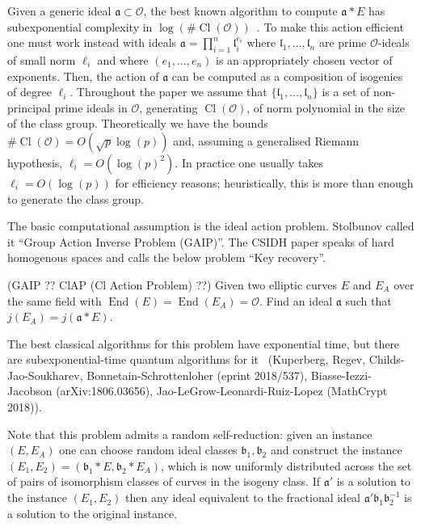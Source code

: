 \documentclass{llncs}
\newcommand{\OO}{\mathcal{O}}
\DeclareMathOperator{\End}{End}
\DeclareMathOperator{\Cl}{Cl}
\renewcommand{\a}{\mathfrak{a}}
\renewcommand{\b}{\mathfrak{b}}
\renewcommand{\l}{\mathfrak{l}}
\begin{document}
Given a generic ideal $\a\subset\OO$, the best known algorithm to compute $\a*E$ has subexponential complexity in $\log(\#\Cl(\OO))$~\cite{JS10}.
To make this action efficient one must work instead with ideals $\a = \prod_{i=1}^n \l_i^{e_i}$ where $\l_1, \dots, \l_n$ are prime $\OO$-ideals of small norm $\ell_i$ and where $(e_1, \dots, e_n)$ is an appropriately chosen vector of exponents.
Then, the action of $\a$ can be computed as a composition of isogenies of degree $\ell_i$.
Throughout the paper we assume that $\{ \l_1, \dots, \l_n \}$ is a set of non-principal prime ideals in $\OO$, generating $\Cl(\OO)$, of norm polynomial in the size of the class group.
Theoretically we have the bounds $\#\Cl(\OO) = O( \sqrt{p} \log(p) )$ and, assuming a generalised Riemann hypothesis, $\ell_i = O( \log(p)^2 )$.
In practice one usually takes $\ell_i=O(\log(p))$ for efficiency reasons; heuristically, this is more than enough to generate the class group.

The basic computational assumption is the ideal action problem.
Stolbunov called it ``Group Action Inverse Problem (GAIP)''.
The CSIDH paper speaks of hard homogenous spaces and calls the below problem ``Key recovery''.

\begin{definition}\label{defn:ass1} (GAIP ?? ClAP (Cl Action Problem) ??)
Given two elliptic curves $E$ and $E_A$ over the same field with $\End(E) = \End(E_A) = \OO$. Find an ideal $\a$ such that $j( E_A ) = j( \a * E )$.
\end{definition}

The best classical algorithms for this problem have exponential time, but there are subexponential-time quantum algorithms for it~\cite{Kup,regev04,childs2014constructing,Kuperberg2013} (Kuperberg, Regev, Childs-Jao-Soukharev, Bonnetain-Schrottenloher (eprint 2018/537), Biasse-Iezzi-Jacobson (arXiv:1806.03656), Jao-LeGrow-Leonardi-Ruiz-Lopez (MathCrypt 2018)).

Note that this problem admits a random self-reduction: given an instance $(E, E_A)$ one can choose random ideal classes $\b_1, \b_2$ and construct the instance $(E_1, E_2) = (\b_1 * E, \b_2 * E_A )$, which is now uniformly distributed across the set of pairs of isomorphism classes of curves in the isogeny class.
If $\a'$ is a solution to the instance $(E_1, E_2)$ then any ideal equivalent to the fractional ideal $\a'\b_1 \b_2^{-1}$ is a solution to the original instance.
\end{document}
